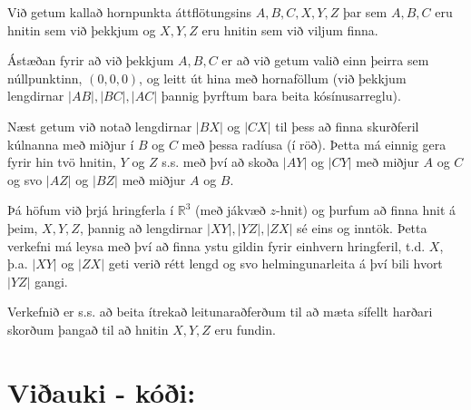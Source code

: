 \documentclass{article}
\begin{document}
Við getum kallað hornpunkta áttflötungsins $A,B,C,X,Y,Z$ þar sem $A,B,C$ eru
hnitin sem við þekkjum og $X,Y,Z$ eru hnitin sem við viljum finna.

Ástæðan fyrir að við þekkjum $A,B,C$ er að við getum valið einn þeirra sem
núllpunktinn, $(0,0,0)$, og leitt út hina með hornaföllum (við þekkjum
lengdirnar $|AB|, |BC|, |AC|$ þannig þyrftum bara beita kósínusarreglu).

Næst getum við notað lengdirnar $|BX|$ og $|CX|$ til þess að finna skurðferil
kúlnanna með miðjur í $B$ og $C$ með þessa radíusa (í röð). Þetta má einnig gera
fyrir hin tvö hnitin, $Y$ og $Z$ s.s. með því að skoða $|AY|$ og $|CY|$ með
miðjur $A$ og $C$ og svo $|AZ|$ og $|BZ|$ með miðjur $A$ og $B$.

Þá höfum við þrjá hringferla í $\mathbb{R}^3$ (með jákvæð $z$-hnit) og þurfum að
finna hnit á þeim, $X,Y,Z$, þannig að lengdirnar $|XY|, |YZ|, |ZX|$ sé eins og
inntök. Þetta verkefni má leysa með því að finna ystu gildin fyrir einhvern
hringferil, t.d. $X$, þ.a. $|XY|$ og $|ZX|$ geti verið rétt lengd og svo
helmingunarleita á því bili hvort $|YZ|$ gangi.

Verkefnið er s.s. að beita ítrekað leitunaraðferðum til að mæta sífellt harðari
skorðum þangað til að hnitin $X,Y,Z$ eru fundin.



\section*{Viðauki - kóði:}
\end{document}
